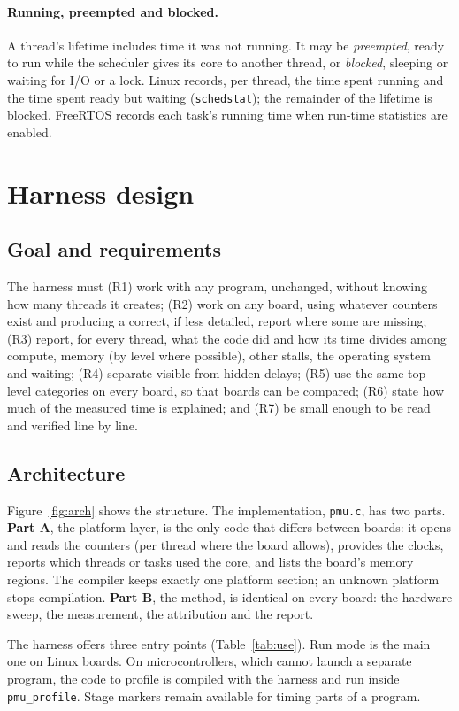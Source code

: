 \documentclass[10pt,a4paper,twocolumn]{article}
\newcommand{\code}[1]{\texttt{\small #1}}
\begin{document}
\paragraph{Running, preempted and blocked.} A thread's lifetime includes time it was not running. It may be \emph{preempted}, ready to run while the scheduler gives its core to another thread, or \emph{blocked}, sleeping or waiting for I/O or a lock. Linux records, per thread, the time spent running and the time spent ready but waiting (\code{schedstat}); the remainder of the lifetime is blocked. FreeRTOS records each task's running time when run-time statistics are enabled.

\section{Harness design}

\subsection{Goal and requirements}
The harness must (R1) work with any program, unchanged, without knowing how many threads it creates; (R2) work on any board, using whatever counters exist and producing a correct, if less detailed, report where some are missing; (R3) report, for every thread, what the code did and how its time divides among compute, memory (by level where possible), other stalls, the operating system and waiting; (R4) separate visible from hidden delays; (R5) use the same top-level categories on every board, so that boards can be compared; (R6) state how much of the measured time is explained; and (R7) be small enough to be read and verified line by line.

\subsection{Architecture}
Figure~\ref{fig:arch} shows the structure. The implementation, \code{pmu.c}, has two parts. \textbf{Part A}, the platform layer, is the only code that differs between boards: it opens and reads the counters (per thread where the board allows), provides the clocks, reports which threads or tasks used the core, and lists the board's memory regions. The compiler keeps exactly one platform section; an unknown platform stops compilation. \textbf{Part B}, the method, is identical on every board: the hardware sweep, the measurement, the attribution and the report.

The harness offers three entry points (Table~\ref{tab:use}). Run mode is the main one on Linux boards. On microcontrollers, which cannot launch a separate program, the code to profile is compiled with the harness and run inside \code{pmu\_profile}. Stage markers remain available for timing parts of a program.
\end{document}
